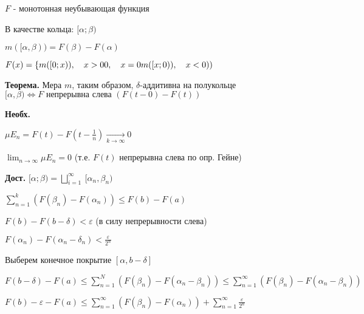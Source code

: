 $F$ - монотонная неубывающая функция

В качестве кольца: $[\alpha; \beta)$

$m([\alpha, \beta)) = F(\beta) - F(\alpha)$



%
%
%
%
%





$F(x) = \{ m([0;x)), \quad x > 0 \\
           0, \quad x = 0 \\
           m([x;0)), \quad  x < 0))$

\textbf{Теорема.} \quad Мера $m$, таким образом,
$\delta$-аддитивна на полукольце $[\alpha, \beta) \Leftrightarrow
F \mbox{ непрерывна слева } (F(t - 0) - F(t))$

\textbf{Необх.} \quad


%
%
%
%
%

$\mu E_n = F(t) - F(t - \frac{1}{n}) \xrightarrow[k \rightarrow
\infty]{} 0$

$\lim_{n \rightarrow \infty} \mu E_n = 0$ (т.е. $F(t)$ непрерывна
слева по опр. Гейне)



\textbf{Дост.} \quad $[\alpha; \beta) = \bigsqcup_{i=1}^{\infty}\:
[\alpha_n, \beta_n)$

$\sum_{n=1}^{k} (F(\beta_n) - F(\alpha_n)) \leqslant F(b) - F(a)$

%
%
%
%
%

$F(b) - F(b - \delta) < \varepsilon$ (в силу непрерывности слева)

$F(\alpha_n) - F(\alpha_n - \delta_n) < \frac{\varepsilon}{2^n}$

Выберем конечное покрытие $[\alpha, b - \delta]$

$F(b - \delta) - F(a) \leqslant \sum_{n=1}^N (F(\beta_n) -
F(\alpha_n - \beta_n)) \leqslant \sum_{n=1}^{\infty} (F(\beta_n) -
F(\alpha_n - \beta_n))$

$F(b) - \varepsilon - F(a) \leqslant \sum_{n=1}^{\infty}
(F(\beta_n) - F(\alpha_n)) + \sum_{n=1}^{\infty}
\frac{\varepsilon}{2^n}$

